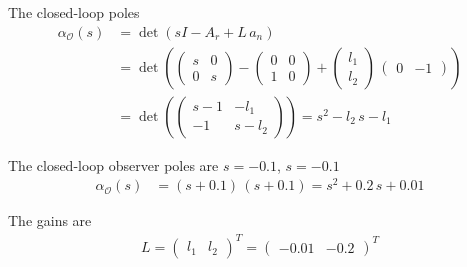 
The closed-loop poles 
\begin{align*}
    \alpha_\mathcal{O}(s) &= \det\left(sI - A_r + L\,a_n\right) \\
    &= \det\left(\begin{pmatrix}
        s & 0 \\ 0 & s
    \end{pmatrix} - \begin{pmatrix} 0 & 0 \\ 1 & 0 \end{pmatrix} + \begin{pmatrix}
        l_1 \\ l_2
    \end{pmatrix}\,\begin{pmatrix} 0 & -1 \end{pmatrix}\right) \\
    &= \det\left(\begin{pmatrix}
        s-1 & -l_1 \\ -1 & s-l_2
    \end{pmatrix}\right) = s^2 -l_2\,s - l_1
\end{align*}

The closed-loop observer poles are $s = -0.1$, $s = -0.1$
\begin{align*}
    \alpha_\mathcal{O}(s) &= \left(s + 0.1\right)\,\left(s + 0.1\right) = s^2 + 0.2\,s + 0.01
\end{align*}

The gains are 
\begin{align*}
    L = \begin{pmatrix}
        l_1 & l_2 
    \end{pmatrix}^T = \begin{pmatrix}
        -0.01 & -0.2
    \end{pmatrix}^T
\end{align*}


